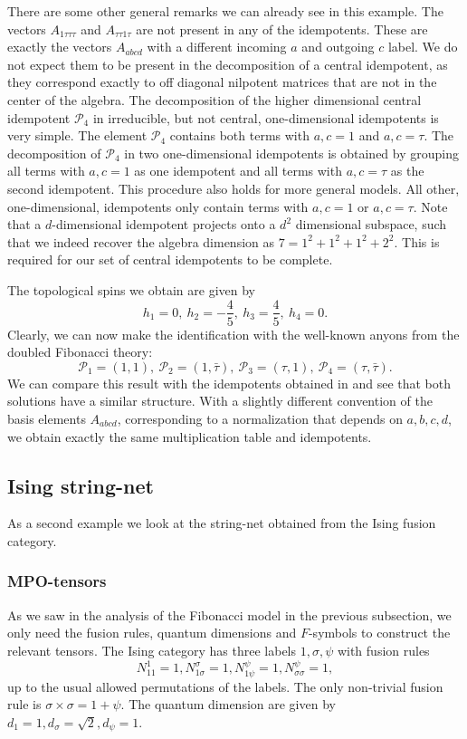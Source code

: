 \documentclass[12 pt]{article}
\begin{document}
There are some other general remarks we can already see in this example. The vectors $A_{1\tau\tau\tau}$ and $A_{\tau\tau 1\tau}$ are not present in any of the idempotents. These are exactly the vectors $A_{abcd}$ with a different incoming $a$ and outgoing $c$ label. We do not expect them to be present in the decomposition of a central idempotent, as they correspond exactly to off diagonal nilpotent matrices that are not in the center of the algebra. The decomposition of the higher dimensional central idempotent $\mathcal{P}_4$ in irreducible, but not central, one-dimensional idempotents is very simple. The element $\mathcal{P}_4$ contains both terms with $a,c=1$ and $a,c=\tau$. The decomposition of $\mathcal{P}_4$ in two one-dimensional idempotents is obtained by grouping all terms with $a,c=1$ as one idempotent and all terms with $a,c=\tau$ as the second idempotent. This procedure also holds for more general models. All other, one-dimensional, idempotents only contain terms with $a,c=1$ or $a,c= \tau$. Note that a $d$-dimensional idempotent projects onto a $d^2$ dimensional subspace, such that we indeed recover the algebra dimension as $7=1^2+1^2+1^2+2^2$. This is required for our set of central idempotents to be complete.

The topological spins we obtain are given by
$$
    h_1=0,\: h_2=-\frac{4}{5},\: h_3=\frac{4}{5},\: h_4=0.
$$
Clearly, we can now make the identification with the well-known anyons from the doubled Fibonacci theory:
$$\mathcal{P}_1=(1,1),\: \mathcal{P}_2=(1,\bar{\tau}),\: \mathcal{P}_3=(\tau,1),\: \mathcal{P}_4=(\tau,\bar{\tau}).$$
We can compare this result with the idempotents obtained in \cite{Qalgebra} and see that both solutions have a similar structure. With a slightly different convention of the basis elements $A_{abcd}$, corresponding to a normalization that depends on $a,b,c,d$, we obtain exactly the same multiplication table and idempotents.

\subsection{Ising string-net}
As a second example we look at the string-net obtained from the Ising fusion category.
\subsubsection{MPO-tensors}
As we saw in the analysis of the Fibonacci model in the previous subsection, we only need the fusion rules, quantum dimensions and $F$-symbols to construct the relevant tensors. The Ising category has three labels $1,\sigma,\psi$ with fusion rules
$$
    N_{11}^1=1, N_{1\sigma}^{\sigma}=1, N_{1\psi}^{\psi}=1, N_{\sigma \sigma}^{\psi}=1,
$$
up to the usual allowed permutations of the labels. The only non-trivial fusion rule is $\sigma \times \sigma = 1 + \psi$. The quantum dimension are given by $d_1=1, d_{\sigma}=\sqrt{2}, d_{\psi}=1$.
\end{document}
